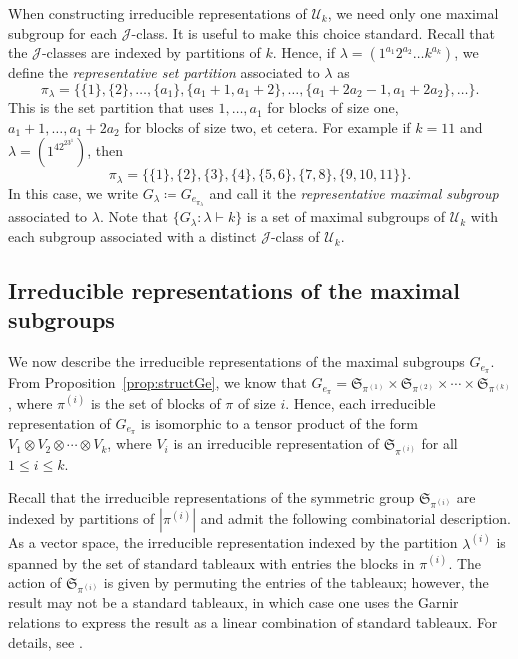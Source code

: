 \documentclass[ALCO,Unicode]{cedram}
\newcommand{\defncolor}{\color{darkred}}
\newcommand{\defn}[1]{{\defncolor\emph{#1}}} %
\begin{document}
When constructing irreducible representations of $\mathcal{U}_k$, we need only one maximal subgroup for each $\mathscr{J}$-class.
It is useful to make this choice standard.
Recall that the $\mathscr{J}$-classes are indexed by partitions of $k$. Hence, if $\lambda = (1^{a_1}2^{a_2}\ldots k^{a_k})$, we define the
\defn{representative set partition} associated to $\lambda$ as
\begin{equation}
\label{equation.canonical}
    \pi_\lambda = \{\{1\}, \{2\}, \ldots, \{a_1\}, \{a_1+1, a_1+2\}, \ldots, \{a_1+2a_2-1, a_1+2a_2\}, \ldots \}.
\end{equation}
This is the set partition that uses $1, \ldots, a_1$ for blocks of size one, $a_1+1, \ldots, a_1+2a_2$ for blocks of size two, et cetera.
For example if $k=11$ and $\lambda = (1^42^23^1)$, then
\[
    \pi_\lambda = \{\{1\}, \{2\}, \{3\}, \{4\},\{5,6\},\{7,8\},\{9,10,11\}\}.
\]
In this case, we write $G_\lambda \coloneqq G_{e_{\pi_\lambda}}$ and call it the
\defn{representative maximal subgroup} associated to $\lambda$.
Note that $\{G_\lambda : \lambda \vdash k\}$ is a set of maximal subgroups of
$\mathcal{U}_k$ with each subgroup associated with a distinct
$\mathscr{J}$-class of $\mathcal{U}_k$.

\subsection{Irreducible representations of the maximal subgroups}
\label{sec:irrepsGe}
We now describe the irreducible representations of the maximal subgroups $G_{e_\pi}$.
From Proposition~\ref{prop:structGe}, we know that
$G_{e_\pi} = \mathfrak{S}_{\pi^{(1)}} \times \mathfrak{S}_{\pi^{(2)}}
\times \cdots \times \mathfrak{S}_{\pi^{(k)}}$,
where $\pi^{(i)}$ is the set of blocks of $\pi$ of size $i$.
Hence, each irreducible representation of $G_{e_\pi}$
is isomorphic to a tensor product of the form
$V_1 \otimes V_2 \otimes \cdots \otimes V_k$,
where $V_i$ is an irreducible representation of $\mathfrak{S}_{\pi^{(i)}}$
for all $1 \leqslant i \leqslant k$.

Recall that the irreducible representations of the symmetric group
$\mathfrak{S}_{\pi^{(i)}}$ are indexed by partitions of $|\pi^{(i)}|$
and admit the following combinatorial description.
As a vector space, the irreducible representation indexed by the partition
$\lambda^{(i)}$ is spanned by the set of standard tableaux with entries the
blocks in $\pi^{(i)}$. The action of $\mathfrak{S}_{\pi^{(i)}}$ is given by
permuting the entries of the tableaux; however, the result may not be
a standard tableaux, in which case one uses the Garnir relations to express the
result as a linear combination of standard tableaux. For details, see
\cite[Chapter~2]{Sagan.2001}.
\end{document}
